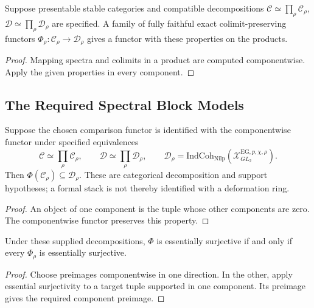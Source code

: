 \begin{theorem}
\label{v4-arith:deg-f1a:thm:colmez-paskunas-blocks}
Suppose presentable stable categories and compatible decompositions
\(\mathcal C\simeq\prod_\rho\mathcal C_\rho\),
\(\mathcal D\simeq\prod_\rho\mathcal D_\rho\) are specified.
A family of fully faithful exact colimit-preserving functors
\(\Phi_\rho:\mathcal C_\rho\to\mathcal D_\rho\) gives a functor
with these properties on the products.
\end{theorem}
\begin{proof}
Mapping spectra and colimits in a product are computed componentwise.
Apply the given properties in every component.
\end{proof}

\subsection{The Required Spectral Block Models}
\begin{proposition}
\label{v4-arith:deg-f1a:prop:spectral-blocks}
Suppose the chosen comparison functor is identified with the
componentwise functor under specified equivalences
\begin{equation}
\label{v4-arith:deg-f1a:eq:EG-block-decomp}
 \mathcal C\simeq\prod_\rho\mathcal C_\rho,\qquad
 \mathcal D\simeq\prod_\rho\mathcal D_\rho,
 \qquad
 \mathcal D_\rho=
 \mathrm{IndCoh}_{\mathrm{Nilp}}(\mathcal X^{\mathrm{EG},p,\chi,\rho}_{GL_2}).
\end{equation}
Then \(\Phi(\mathcal C_\rho)\subseteq\mathcal D_\rho\).
These are categorical decomposition and support hypotheses; a
formal stack is not thereby identified with a deformation ring.
\end{proposition}
\begin{proof}
An object of one component is the tuple whose other components are
zero. The componentwise functor preserves this property.
\end{proof}

\begin{corollary}
\label{v4-arith:deg-f1a:cor:ess-surj-block-by-block}
Under these supplied decompositions, \(\Phi\) is essentially
surjective if and only if every \(\Phi_\rho\) is essentially surjective.
\end{corollary}
\begin{proof}
Choose preimages componentwise in one direction. In the other,
apply essential surjectivity to a target tuple supported in one
component. Its preimage gives the required component preimage.
\end{proof}

